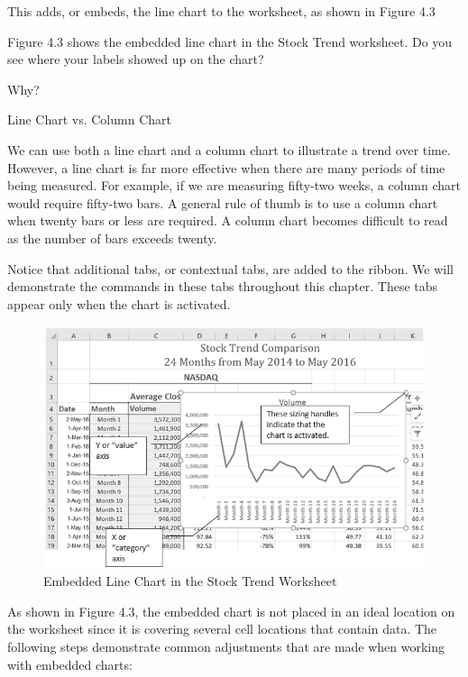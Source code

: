 This adds, or embeds, the line chart to the worksheet, as shown in Figure 4.3

Figure 4.3 shows the embedded line chart in the Stock Trend worksheet. Do you see where your labels
showed up on the chart?




Why?

Line Chart vs. Column Chart

We can use both a line chart and a column chart to illustrate a trend over time. However, a line chart is far more
effective when there are many periods of time being measured. For example, if we are measuring fifty-two weeks,
a column chart would require fifty-two bars. A general rule of thumb is to use a column chart when twenty bars or
less are required. A column chart becomes difficult to read as the number of bars exceeds twenty.





Notice that additional tabs, or contextual tabs, are added to the ribbon. We will demonstrate the
commands in these tabs throughout this chapter. These tabs appear only when the chart is activated.

\begin{figure}[H]
	\centering
	\includegraphics[width=\maxwidth{.95\linewidth}]{gfx/ch04_fig03}
	\caption{Embedded Line Chart in the Stock Trend Worksheet}
	\label{04:fig03}
\end{figure}






As shown in Figure 4.3, the embedded chart is not placed in an ideal location on the worksheet
since it is covering several cell locations that contain data. The following steps demonstrate common
adjustments that are made when working with embedded charts:

